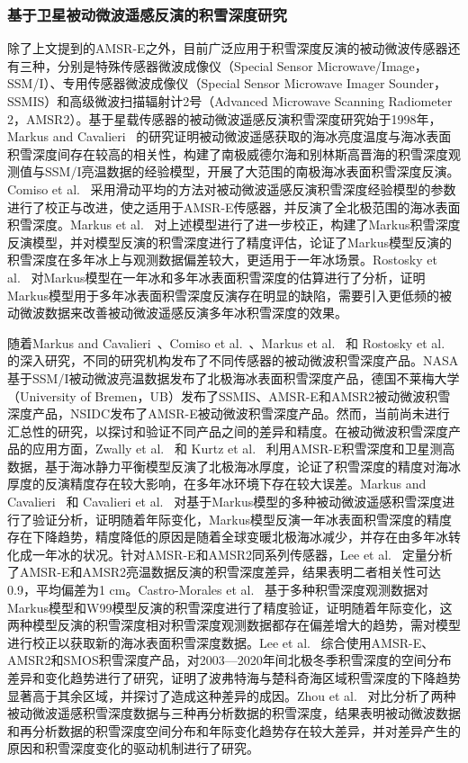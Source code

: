 \subsubsection{基于卫星被动微波遥感反演的积雪深度研究}
除了上文提到的AMSR-E之外，目前广泛应用于积雪深度反演的被动微波传感器还有三种，分别是特殊传感器微波成像仪（Special Sensor Microwave/Image，SSM/I）、专用传感器微波成像仪（Special Sensor Microwave Imager Sounder，SSMIS）和高级微波扫描辐射计2号（Advanced Microwave Scanning Radiometer 2，AMSR2）。基于星载传感器的被动微波遥感反演积雪深度研究始于1998年，Markus and Cavalieri~\cite{markus_cavalieri1998} 的研究证明被动微波遥感获取的海冰亮度温度与海冰表面积雪深度间存在较高的相关性，构建了南极威德尔海和别林斯高晋海的积雪深度观测值与SSM/I亮温数据的经验模型，开展了大范围的南极海冰表面积雪深度反演。Comiso et al.~\cite{comiso2003} 采用滑动平均的方法对被动微波遥感反演积雪深度经验模型的参数进行了校正与改进，使之适用于AMSR-E传感器，并反演了全北极范围的海冰表面积雪深度。Markus et al.~\cite{markus2006} 对上述模型进行了进一步校正，构建了Markus积雪深度反演模型，并对模型反演的积雪深度进行了精度评估，论证了Markus模型反演的积雪深度在多年冰上与观测数据偏差较大，更适用于一年冰场景。Rostosky et al.~\cite{rostosky2018} 对Markus模型在一年冰和多年冰表面积雪深度的估算进行了分析，证明Markus模型用于多年冰表面积雪深度反演存在明显的缺陷，需要引入更低频的被动微波数据来改善被动微波遥感反演多年冰积雪深度的效果。

随着Markus and Cavalieri~\cite{markus_cavalieri1998}、Comiso et al.~\cite{comiso2003}、Markus et al.~\cite{markus2006} 和 Rostosky et al.~\cite{rostosky2018} 的深入研究，不同的研究机构发布了不同传感器的被动微波积雪深度产品。NASA基于SSM/I被动微波亮温数据发布了北极海冰表面积雪深度产品，德国不莱梅大学（University of Bremen，UB）发布了SSMIS、AMSR-E和AMSR2被动微波积雪深度产品，NSIDC发布了AMSR-E被动微波积雪深度产品。然而，当前尚未进行汇总性的研究，以探讨和验证不同产品之间的差异和精度。在被动微波积雪深度产品的应用方面，Zwally et al.~\cite{zwally2008} 和 Kurtz et al.~\cite{kurtz2009} 利用AMSR-E积雪深度和卫星测高数据，基于海冰静力平衡模型反演了北极海冰厚度，论证了积雪深度的精度对海冰厚度的反演精度存在较大影响，在多年冰环境下存在较大误差。Markus and Cavalieri~\cite{markus_cavalieri2011} 和 Cavalieri et al.~\cite{cavalieri2012} 对基于Markus模型的多种被动微波遥感积雪深度进行了验证分析，证明随着年际变化，Markus模型反演一年冰表面积雪深度的精度存在下降趋势，精度降低的原因是随着全球变暖北极海冰减少，并存在由多年冰转化成一年冰的状况。针对AMSR-E和AMSR2同系列传感器，Lee et al.~\cite{lee2015} 定量分析了AMSR-E和AMSR2亮温数据反演的积雪深度差异，结果表明二者相关性可达0.9，平均偏差为1 cm。Castro-Morales et al.~\cite{castro_morales2017} 基于多种积雪深度观测数据对Markus模型和W99模型反演的积雪深度进行了精度验证，证明随着年际变化，这两种模型反演的积雪深度相对积雪深度观测数据都存在偏差增大的趋势，需对模型进行校正以获取新的海冰表面积雪深度数据。Lee et al.~\cite{lee2021} 综合使用AMSR-E、AMSR2和SMOS积雪深度产品，对2003—2020年间北极冬季积雪深度的空间分布差异和变化趋势进行了研究，证明了波弗特海与楚科奇海区域积雪深度的下降趋势显著高于其余区域，并探讨了造成这种差异的成因。Zhou et al.~\cite{zhou2021} 对比分析了两种被动微波遥感积雪深度数据与三种再分析数据的积雪深度，结果表明被动微波数据和再分析数据的积雪深度空间分布和年际变化趋势存在较大差异，并对差异产生的原因和积雪深度变化的驱动机制进行了研究。

